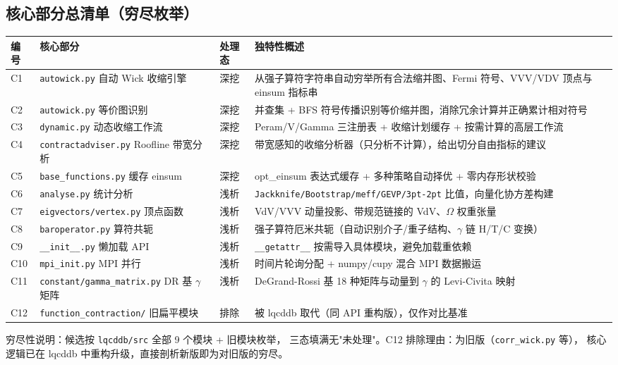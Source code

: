 \documentclass[UTF8]{ctexart}
\begin{document}
\subsection{核心部分总清单（穷尽枚举）}

\begin{xltabular}{\textwidth}{lllX}
\toprule
\textcolor{algo}{编号} & 核心部分 & 处理态 & 独特性概述 \\
\midrule
\endhead
C1 & \nolinkurl{autowick.py} 自动 Wick 收缩引擎 & 深挖 &
从强子算符字符串自动穷举所有合法缩并图、Fermi 符号、VVV/VDV 顶点与
einsum 指标串 \\
C2 & \nolinkurl{autowick.py} 等价图识别 & 深挖 &
并查集 + BFS 符号传播识别等价缩并图，消除冗余计算并正确累计相对符号 \\
C3 & \nolinkurl{dynamic.py} 动态收缩工作流 & 深挖 &
Peram/V/Gamma 三注册表 + 收缩计划缓存 + 按需计算的高层工作流 \\
C4 & \nolinkurl{contractadviser.py} Roofline 带宽分析 & 深挖 &
带宽感知的收缩分析器（只分析不计算），给出切分自由指标的建议 \\
C5 & \nolinkurl{base_functions.py} 缓存 einsum & 深挖 &
opt\_einsum 表达式缓存 + 多种策略自动择优 + 零内存形状校验 \\
C6 & \nolinkurl{analyse.py} 统计分析 & 浅析 &
\nolinkurl{Jackknife/Bootstrap/meff/GEVP/3pt-2pt} 比值，向量化协方差构建 \\
C7 & \nolinkurl{eigvectors/vertex.py} 顶点函数 & 浅析 &
VdV/VVV 动量投影、带规范链接的 VdV、$\Omega$ 权重张量 \\
C8 & \nolinkurl{baroperator.py} 算符共轭 & 浅析 &
强子算符厄米共轭（自动识别介子/重子结构、$\gamma$ 链 H/T/C 变换） \\
C9 & \nolinkurl{__init__.py} 懒加载 API & 浅析 &
\nolinkurl{__getattr__} 按需导入具体模块，避免加载重依赖 \\
C10 & \nolinkurl{mpi_init.py} MPI 并行 & 浅析 &
时间片轮询分配 + numpy/cupy 混合 MPI 数据搬运 \\
C11 & \nolinkurl{constant/gamma_matrix.py} DR 基 $\gamma$ 矩阵 & 浅析 &
DeGrand-Rossi 基 18 种矩阵与动量到 $\gamma$ 的 Levi-Civita 映射 \\
C12 & \nolinkurl{function_contraction/} 旧扁平模块 & 排除 &
被 lqcddb 取代（同 API 重构版），仅作对比基准 \\
\bottomrule
\end{xltabular}

穷尽性说明：候选按 \texttt{lqcddb/src} 全部 9 个模块 + 旧模块枚举，
三态填满无"未处理"。C12 排除理由：为旧版（\texttt{corr\_wick.py} 等），
核心逻辑已在 lqcddb 中重构升级，直接剖析新版即为对旧版的穷尽。
\end{document}
